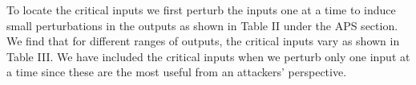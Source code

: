 To locate the critical inputs we first perturb the inputs one at a time to induce small perturbations in the outputs as shown in Table II under the APS section. We find that for different ranges of outputs, the critical inputs vary as shown in Table III. We have included the critical inputs when we perturb only one input at a time since these are the most useful from an attackers' perspective. 












